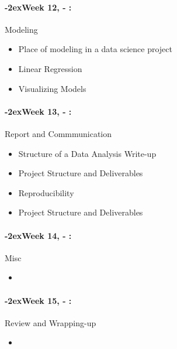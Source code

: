 \documentclass[11pt]{article}
\newcommand{\week}[1]{%
  \paragraph*{\kern-2ex\quad #1, \syldate{\today} - \AdvanceDate[4]\syldate{\today}:}%
  \ifdim\wd1=\wd\MONDAY
    \AdvanceDate[7]
  \else
    \AdvanceDate[7]
  \fi%
}
\begin{document}
\week{Week 12} Modeling
\begin{itemize}
\item Place of modeling in a data science project
\item Linear Regression
\item Visualizing Models
\end{itemize}

\week{Week 13} Report and Commmunication
\begin{itemize}
\item Structure of a Data Analysis Write-up
\item Project Structure and Deliverables
\item Reproducibility
\item Project Structure and Deliverables
\end{itemize}

\week{Week 14} Misc
\begin{itemize}
\item 
\end{itemize}

\week{Week 15} Review and Wrapping-up
\begin{itemize}
\item 
\end{itemize}
\end{document}
